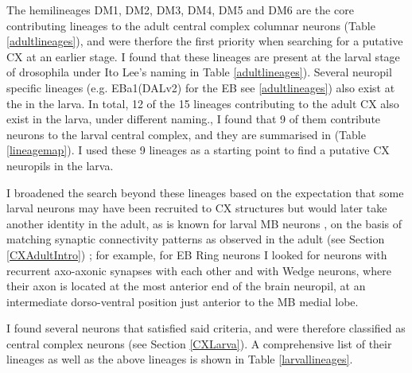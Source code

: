     The hemilineages DM1, DM2, DM3, DM4, DM5 and DM6 are the core contributing lineages to the adult central complex columnar neurons (Table \ref{adultlineages}), and were therfore the first priority when searching for a putative CX at an earlier stage. I found that these lineages are present at the larval stage of drosophila under Ito Lee's naming in Table \ref{adultlineages}).  Several neuropil specific lineages (e.g. EBa1(DALv2) for the EB see \ref{adultlineages}) also exist at the in the larva. In total, 12 of the 15 lineages contributing to the adult CX also exist in the larva, under different naming., I found that 9 of them contribute neurons to the larval central complex, and they are summarised in (Table \ref{lineagemap}).  I used these 9 lineages as a starting point to find a putative CX neuropils in the larva.

    I broadened the search beyond these lineages based on the expectation that some larval neurons may have been recruited to CX structures but would later take another identity in the adult, as is known for larval MB neurons \citep{truman2023metamorphosis}, on the basis of matching synaptic connectivity patterns as observed in the adult (see Section \ref{CXAdultIntro}) ; for example, for EB Ring neurons I looked for neurons with recurrent axo-axonic synapses with each other and with Wedge neurons, where their axon is located at the most anterior end of the brain neuropil, at an intermediate dorso-ventral position just anterior to the MB medial lobe.

    I found several neurons that satisfied said criteria, and were therefore classified as central complex neurons (see Section \ref{CXLarva}). A comprehensive list of their lineages as well as the above lineages is shown in Table \ref{larvallineages}. 
    
